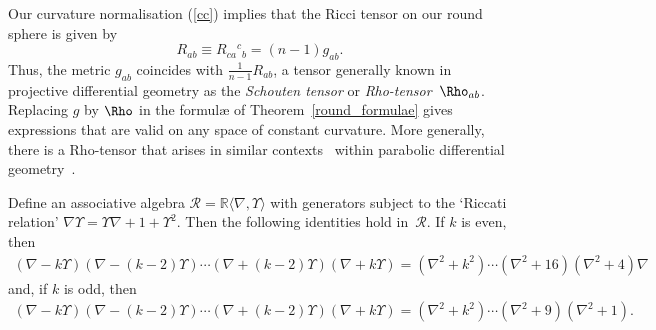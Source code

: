 \begin{remark}Our curvature normalisation (\ref{cc}) implies that the Ricci
tensor on our round sphere is given by
\[R_{ab}\equiv R_{ca}{}^c{}_b=(n-1)g_{ab}.\]
Thus, the metric $g_{ab}$ coincides with $\frac{1}{n-1}R_{ab}$, a tensor
generally known in projective dif\/ferential geometry \cite{eProjective} as the
{\em Schouten tensor\/} or {\em Rho-tensor\/}~$\Rho_{ab}$. Replacing $g$ by
$\Rho$ in the formul{\ae} of Theorem~\ref{round_formulae} gives expressions
that are valid on any space of constant curvature. More generally, there is a
Rho-tensor that arises in similar contexts~\cite{cds} within parabolic
dif\/ferential geometry~\cite{thebook}.
\end{remark}
\begin{lemma}\label{pretricky} Define an associative algebra
${\mathcal{R}}={\mathbb{R}}\langle\nabla,\Upsilon\rangle$ with generators
subject to the `Riccati relation'
$\nabla\Upsilon=\Upsilon\nabla+1+\Upsilon^2$. Then the following identities
hold in~${\mathcal{R}}$. If $k$ is even, then
\begin{gather*}
(\nabla-k\Upsilon)(\nabla-(k-2)\Upsilon)\cdots
(\nabla+(k-2)\Upsilon)(\nabla+k\Upsilon)=
(\nabla^2+k^2)\cdots(\nabla^2+16)(\nabla^2+4)\nabla\!
\end{gather*}
and, if $k$ is odd, then
\begin{gather*}
(\nabla-k\Upsilon)(\nabla-(k-2)\Upsilon)\cdots
(\nabla+(k-2)\Upsilon)(\nabla+k\Upsilon)=
(\nabla^2+k^2)\cdots(\nabla^2+9)(\nabla^2+1).
\end{gather*}
\end{lemma}
